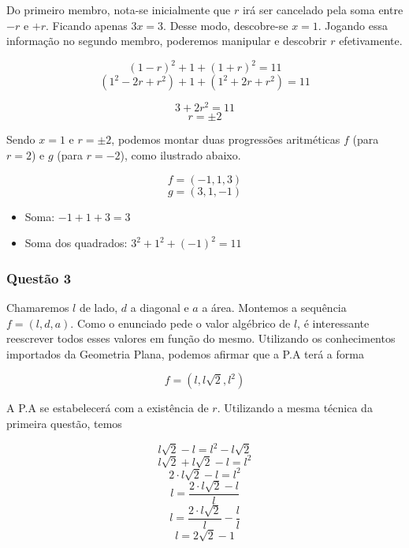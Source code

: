 Do primeiro membro, nota-se inicialmente que $r$ irá ser cancelado pela soma entre $-r$ e $+r$. Ficando apenas $3x = 3$. Desse modo, descobre-se $x = 1$. Jogando essa informação no segundo membro, poderemos manipular e descobrir $r$ efetivamente.

\begin{tcolorbox}[colback=LightYellow]
\[(1 - r)^{2} + 1 + (1 + r)^{2} = 11\]
\[(1^{2} - 2r + r^{2}) + 1 + (1^{2} + 2r + r^{2}) = 11\]
\end{tcolorbox}

\begin{tcolorbox}[colback=LightYellow]
\[3 + 2r^{2} = 11 \]
\[r = \pm 2\]
\end{tcolorbox}

Sendo $x = 1$ e $r = \pm 2$, podemos montar duas progressões aritméticas $f$ (para $r = 2$) e $g$ (para $r = -2$), como ilustrado abaixo.

\begin{tcolorbox}[colback=LightYellow]
  \[f = (-1, 1, 3)\]
  \[g = (3, 1, -1)\]

  \begin{itemize}
          \item Soma: $-1 + 1 + 3 = 3$
          \item Soma dos quadrados: $3^{2} + 1^{2} + (-1)^{2} = 11$
  \end{itemize}
\end{tcolorbox}

\subsubsection*{Questão 3}

\hrulefill

Chamaremos $l$ de lado, $d$ a diagonal e $a$ a área. Montemos a sequência $f = (l, d, a)$. Como o enunciado pede o valor algébrico de $l$, é interessante reescrever todos esses valores em função do mesmo. Utilizando os conhecimentos importados da Geometria Plana, podemos afirmar que a P.A terá a forma

\begin{tcolorbox}[colback=LightYellow]
\[f = (l, l\sqrt{2}, l^{2})\]
\end{tcolorbox}

A P.A se estabelecerá com a existência de $r$. Utilizando a mesma técnica da primeira questão, temos

\begin{tcolorbox}[colback=LightYellow]
\[l\sqrt{2} - l = l^{2} - l\sqrt{2} \]
\[l\sqrt{2} + l\sqrt{2} - l = l^{2}\]
\[2\cdot l\sqrt{2} - l = l^{2}\]
\[l = \frac{2\cdot l\sqrt{2} - l}{l}\]
\[l = \frac{2\cdot l\sqrt{2}}{l} - \frac{l}{l}\]
\[l = 2\sqrt{2} - 1\]
\end{tcolorbox}

